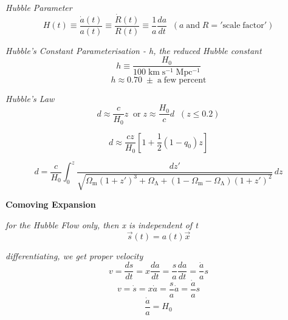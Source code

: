 \documentclass{article}
\begin{document}
\textit {Hubble Parameter}
\begin{equation}
H(t) \equiv \frac {\dot{a}(t)}{a(t)} \equiv \frac {\dot{R}(t)}{R(t)} \equiv \frac {1}{a} \frac {da}{dt} \; \; (a \; \mathrm{and} \; R = \mathrm{'scale \; factor'})
\end{equation}

\textit {Hubble's Constant Parameterisation - h, the reduced Hubble constant}
\begin{equation}
h \equiv \frac {H_\mathrm{0}}{\mathrm{100 \; km \; s^{-1} \; Mpc^{-1}}}
\end{equation}
\begin{equation}
h \approx 0.70 \; \pm \; \mathrm{a \; few \; percent}
\end{equation}

\textit {Hubble's Law}
\begin{equation}
d \approx \frac {c}{H_\mathrm{0}}z \; \; \mathrm{or} \;z \approx \frac {H_\mathrm{0}}{c} d \; \; (z \leq {0.2})
\end{equation}

\begin{equation}
d \approx \frac {cz}{H_\mathrm{0}} \left[ 1 + \frac {1}{2} (1 - q_\mathrm{0})z \right]
\end{equation}

\begin{equation}
d = \frac{c}{H_\mathrm{0}} \int_{0}^{z} \frac{dz'}{\sqrt{\Omega_\mathrm{m} (1 + z')^3 + \Omega_\mathrm{\Lambda} + (1 - \Omega_\mathrm{m} - \Omega_\mathrm{\Lambda}) (1 + z')^2}} \,dz 
\end{equation}

\textbf {Comoving Expansion}


\textit {for the Hubble Flow only, then x is independent of t}
\begin{equation}
\vec{s}(t) = a(t) \vec{x}
\end{equation}

\textit{differentiating, we get proper velocity}
\begin{equation}
v = \frac{ds}{dt} = x \frac{da}{dt} = \frac{s}{a} \frac{da}{dt} = \frac{\dot{a}}{a}s
\end{equation}
\begin{equation}
v = \dot{s} = x \dot{a} = \frac{s}{a} \dot{a} = \frac{\dot{a}}{a}s
\end{equation}
\begin{equation}
\frac{\dot{a}}{a} = H_\mathrm{0}
\end{equation}
\end{document}
